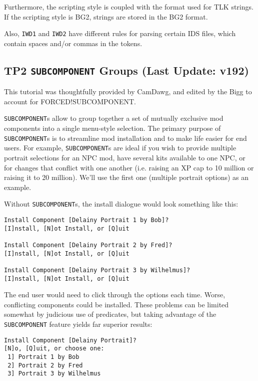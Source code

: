\documentclass{article}
\def\DEFINE#1{{\tt \bf #1}\label{#1}\index{#1}}
\def\t#1{{\tt #1}}
\begin{document}
Furthermore, the scripting style is coupled with the format used for TLK strings. If
the scripting style is BG2, strings are stored in the BG2 format.

Also, \t{IWD1} and \t{IWD2} have different rules for parsing certain IDS files,
which contain spaces and/or commas in the tokens.

\subsection{TP2 \DEFINE{SUBCOMPONENT} Groups (Last Update: v192)}

This tutorial was thoughtfully provided by CamDawg, and edited by the Bigg
to account for FORCED!SUBCOMPONENT.

\t{SUBCOMPONENT}s allow to group together a set of mutually exclusive mod
components into a single menu-style selection. The primary purpose of
\t{SUBCOMPONENT}s is to streamline mod installation and to make life easier for
end users. For example, \t{SUBCOMPONENT}s are ideal if you wish to provide
multiple portrait selections for an NPC mod, have several kits available to
one NPC, or for changes that conflict with one another (i.e. raising an XP
cap to 10 million or raising it to 20 million). We'll use the first
one (multiple portrait options) as an example.

Without \t{SUBCOMPONENT}s, the install dialogue would look something like this:

\begin{verbatim}
Install Component [Delainy Portrait 1 by Bob]?
[I]nstall, [N]ot Install, or [Q]uit

Install Component [Delainy Portrait 2 by Fred]?
[I]nstall, [N]ot Install, or [Q]uit

Install Component [Delainy Portrait 3 by Wilhelmus]?
[I]nstall, [N]ot Install, or [Q]uit
\end{verbatim}

The end user would need to click through the options each time. Worse,
conflicting components could be installed. These problems can be limited
somewhat by judicious use of predicates, but taking advantage of the
\t{SUBCOMPONENT} feature yields far superior results:

\begin{verbatim}
Install Component [Delainy Portrait]?
[N]o, [Q]uit, or choose one:
 1] Portrait 1 by Bob
 2] Portrait 2 by Fred
 3] Portrait 3 by Wilhelmus
\end{verbatim}
\end{document}
